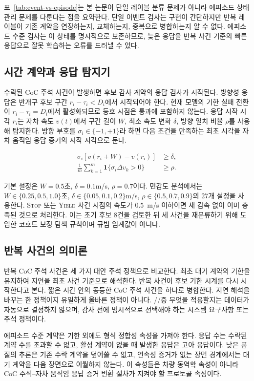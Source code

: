 표~\ref{tab:event-vs-episode}는 본 논문이 단일 레이블 분류 문제가 아니라 에피소드 상태 관리 문제를 다룬다는 점을 요약한다. 단일 이벤트 검사는 구현이 간단하지만 반복 레이블이 기존 계약을 연장하는지, 교체하는지, 중복으로 병합하는지 알 수 없다. 에피소드 수준 검사는 이 상태를 명시적으로 보존하므로, 늦은 응답을 반복 사건 기준의 빠른 응답으로 잘못 학습하는 오류를 드러낼 수 있다.

\subsection{시간 계약과 응답 탐지기}
수락된 CoC 주석 사건이 발생하면 후보 감사 계약의 응답 검사가 시작된다. 방향성 응답은 반개구 후보 구간 $r_i-\tau_i<D_i$에서 시작되어야 한다. 현재 모델의 기한 실패 전환이 $r_i-\tau_i=D_i$에서 활성화되므로 등호 시점은 통과에 포함하지 않는다. 응답 시작 시각 $r_i$는 자차 속도 $v(t)$에서 구간 길이 $W$, 최소 속도 변화 $\delta$, 방향 일치 비율 $\rho$를 사용해 탐지한다. 방향 부호를 $\sigma_i\in\{-1,+1\}$라 하면 다음 조건을 만족하는 최초 시각을 자차 움직임 응답 증거의 시작 시각으로 둔다.

\begin{align}
\sigma_i[v(r_i+W)-v(r_i)] &\ge \delta,\\
\frac{1}{m}\sum_{k=1}^{m}\mathbf{1}\{\sigma_i\Delta v_k>0\} &\ge \rho.
\end{align}

기본 설정은 $W=0.5$초, $\delta=0.1$m/s, $\rho=0.7$이다. 민감도 분석에서는 $W\in\{0.25,0.5,1.0\}$초, $\delta\in\{0.05,0.1,0.2\}$m/s, $\rho\in\{0.5,0.7,0.9\}$의 27개 설정을 사용한다. \textsc{Stop} 또는 \textsc{Yield} 사건 시점의 속도가 $0.5$~m/s 이하이면 새 감속 없이 이미 충족된 것으로 처리한다. 이는 초기 후보 8건을 검토한 뒤 세 사건을 재분류하기 위해 도입한 코호트 보정 탐색 규칙이며 규범 임계값이 아니다.

\subsection{반복 사건의 의미론}
반복 CoC 주석 사건은 세 가지 대안 주석 정책으로 비교한다.  최초 대기 계약의 기한을 유지하여 지연을 최초 사건 기준으로 해석한다.  반복 사건이 후보 기한 시계를 다시 시작한다고 본다.  짧은 시간 안의 동등한 CoC 주석 사건을 하나로 병합한다.  지연 해석을 바꾸는 한 정책이지 유일하게 올바른 정책이 아니다. \preserve/\reset/\dedup 중 무엇을 적용할지는 데이터가 자동으로 결정하지 않으며, 감사 전에 명시적으로 선택해야 하는 시스템 요구사항 또는 주석 정책이다.

에피소드 수준 계약은 기한 외에도 형식 정합성 속성을 가져야 한다. 응답 수는 수락된 계약 수를 초과할 수 없고, 활성 계약이 없을 때 발생한 응답은 고아 응답이다. 낮은 품질의 추론은 기존 수락 계약을 덮어쓸 수 없고, 연속성 증거가 없는 장면 경계에서는 대기 계약을 다음 장면으로 이월하지 않는다. 이 속성들은 차량 동역학 속성이 아니라 CoC 주석--자차 움직임 응답 증거 변환 절차가 지켜야 할 프로토콜 속성이다.
